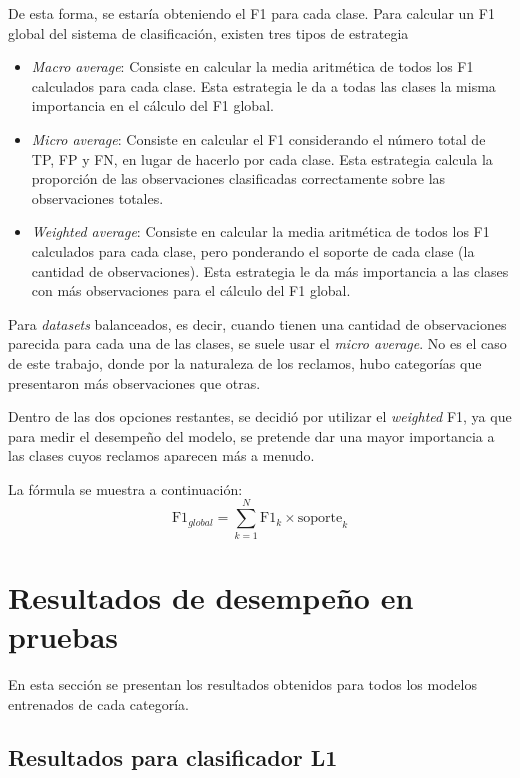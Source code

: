 De esta forma, se estaría obteniendo el F1 para cada clase. Para calcular un F1 global del sistema de clasificación, existen tres tipos de estrategia \citep{WEBSITE:28}
\begin{itemize}
	\item \textit{Macro average}: Consiste en calcular la media aritmética de todos los F1 calculados para cada clase. Esta estrategia le da a todas las clases la misma importancia en el cálculo del F1 global.
	\item \textit{Micro average}: Consiste en calcular el F1 considerando el número total de TP, FP y FN, en lugar de hacerlo por cada clase. Esta estrategia calcula la proporción de las observaciones clasificadas correctamente sobre las observaciones totales.
	\item \textit{Weighted average}: Consiste en calcular la media aritmética de todos los F1 calculados para cada clase, pero ponderando el soporte de cada clase (la cantidad de observaciones). Esta estrategia le da más importancia a las clases con más observaciones para el cálculo del F1 global.
\end{itemize}

Para \textit{datasets} balanceados, es decir, cuando tienen una cantidad de observaciones parecida para cada una de las clases, se suele usar el \textit{micro average}. No es el caso de este trabajo, donde por la naturaleza de los reclamos, hubo categorías que presentaron más observaciones que otras.

Dentro de las dos opciones restantes, se decidió por utilizar el \textit{weighted} F1, ya que para medir el desempeño del modelo, se pretende dar una mayor importancia a las clases cuyos reclamos aparecen más a menudo. 

La fórmula se muestra a continuación:
\begin{equation}
\text{F1}_{global}=\sum_{k=1}^{N}\text{F1}_{k} \times \text{soporte}_{k} 
\end{equation}

\section{Resultados de desempeño en pruebas}

En esta sección se presentan los resultados obtenidos para todos los modelos entrenados de cada categoría.

\subsection{Resultados para clasificador L1}

